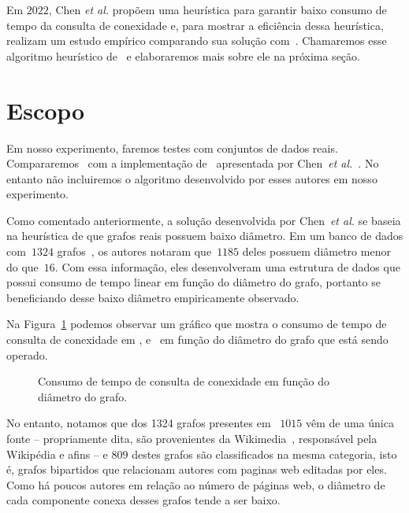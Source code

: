 Em $2022$, Chen \textit{et al.}\cite{QC22} propõem uma heurística para garantir baixo consumo de tempo da consulta de conexidade e, para mostrar a eficiência dessa heurística, realizam um estudo empírico comparando sua solução com~\HK{}.
Chamaremos esse algoritmo heurístico de~\CLHB{} e elaboraremos mais sobre ele na próxima seção.

\section{Escopo}

Em nosso experimento, faremos testes com conjuntos de dados reais.
Compararemos~\HDT{} com a implementação de~\HK{} apresentada por Chen~\textit{et al.}~\cite{QC22}.
No entanto não incluiremos o algoritmo desenvolvido por esses autores em nosso experimento.

Como comentado anteriormente, a solução desenvolvida por Chen~\textit{et al.} se baseia na heurística de que grafos reais possuem baixo diâmetro.
Em um banco de dados com~$1324$ grafos~\cite{KONECT}, os autores notaram que~$1185$ deles possuem diâmetro menor do que~$16$.
Com essa informação, eles desenvolveram uma estrutura de dados que possui consumo de tempo linear em função do diâmetro do grafo,
portanto se beneficiando desse baixo diâmetro empiricamente observado.

Na Figura~\ref{fig:sensibilidade-diametro} podemos observar um gráfico que mostra o consumo de tempo de consulta de conexidade em \HK{}, \HDT{} e~\CLHB{} em função do diâmetro do grafo que está sendo operado.

\begin{figure}
\caption{Consumo de tempo de consulta de conexidade em função do diâmetro do grafo.}
\label{fig:sensibilidade-diametro}
\end{figure}

No entanto, notamos que dos 1324 grafos presentes em~\cite{KONECT} $1015$ vêm de uma única fonte -- 
propriamente dita, são provenientes da Wikimedia~\cite{wikimedia}, responsável pela Wikipédia e afins -- 
e $809$ destes grafos são classificados na mesma categoria, isto é, grafos bipartidos que relacionam autores com paginas web editadas por eles. Como há poucos autores em relação ao número de páginas web, o diâmetro de cada componente conexa desses grafos tende a ser baixo.

